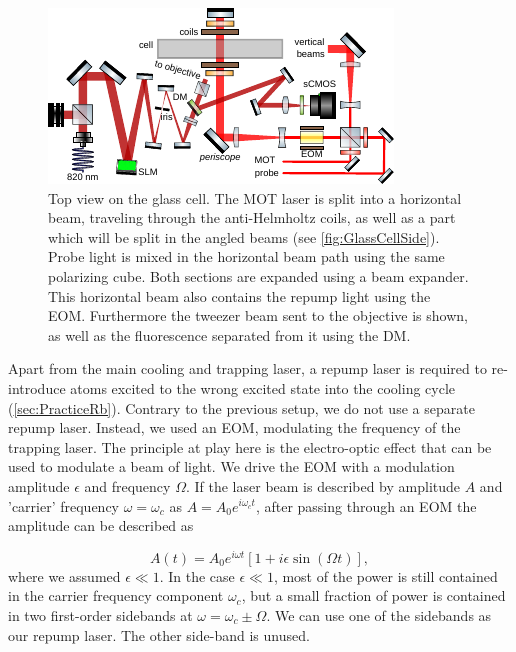 \begin{figure}[t]
    \centering
    \includegraphics[width=\textwidth]{figures/MOTupview.pdf}
    \caption{
    Top view on the glass cell.
    The MOT laser is split into a horizontal beam, traveling through the anti-Helmholtz coils, as well as a part which will be split in the angled beams (see \cref{fig:GlassCellSide}). 
    Probe light is mixed in the horizontal beam path using the same polarizing cube. 
    Both sections are expanded using a beam expander.
    This horizontal beam also contains the repump light using the \ac{EOM}.
    Furthermore the tweezer beam sent to the objective is shown, as well as the fluorescence separated from it using the \acf{DM}.
    }
    \label{fig:GlassCellTop}
\end{figure}

Apart from the main cooling and trapping laser, a repump laser is required to re-introduce atoms excited to the wrong excited state into the cooling cycle (\cref{sec:PracticeRb}).
Contrary to the previous setup, we do not use a separate repump laser. 
Instead, we used an \ac{EOM}, modulating the frequency of the trapping laser. 
The principle at play here is the electro-optic effect that can be used to modulate a beam of light. 
We drive the EOM with a modulation amplitude $\epsilon$ and frequency $\Omega$.
If the laser beam is described by amplitude $A$ and 'carrier' frequency $\omega = \omega_c$ as $A = A_0 e^{i \omega_c t}$, after passing through an EOM the amplitude can be described as

\begin{equation}
    A(t) = A_0 e^{i \omega t}\left[1+i \epsilon \sin(\Omega t)\right],
\end{equation}
where we assumed $\epsilon \ll 1$.
In the case $\epsilon \ll 1$, most of the power is still contained in the carrier frequency component $\omega_c$, but a small fraction of power is contained in two first-order sidebands at $\omega=\omega_c \pm \Omega$.
We can use one of the sidebands as our repump laser. 
The other side-band is unused. 


